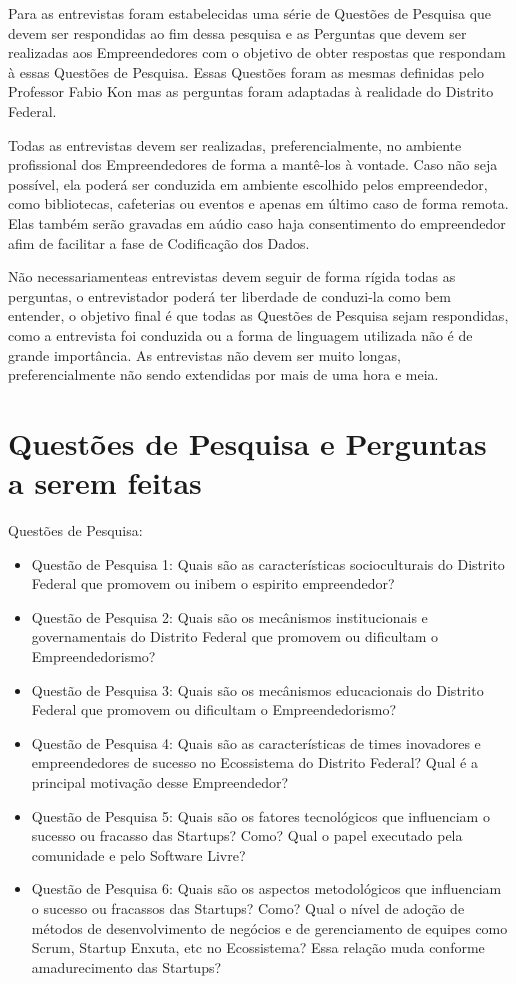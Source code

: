 Para as entrevistas foram estabelecidas uma série de Questões de Pesquisa que devem ser respondidas ao fim dessa pesquisa e as Perguntas que devem ser realizadas aos Empreendedores com o objetivo de
obter respostas que respondam à essas Questões de Pesquisa. Essas Questões foram as mesmas definidas pelo Professor Fabio Kon mas as perguntas foram adaptadas à realidade do Distrito Federal.

Todas as entrevistas devem ser realizadas, preferencialmente, no ambiente profissional dos Empreendedores de forma a mantê-los à vontade. Caso não seja possível, ela poderá ser conduzida em ambiente
escolhido pelos empreendedor, como bibliotecas, cafeterias ou eventos e apenas em último caso de forma remota. Elas também serão gravadas em aúdio caso haja consentimento do empreendedor afim de
facilitar a fase de Codificação dos Dados.

Não necessariamenteas entrevistas devem seguir de forma rígida todas as perguntas, o entrevistador poderá ter liberdade de conduzi-la como bem entender, o objetivo final é que todas as Questões de Pesquisa
sejam respondidas, como a entrevista foi conduzida ou a forma de linguagem utilizada não é de grande importância. As entrevistas não devem ser muito longas, preferencialmente não sendo extendidas por mais
de uma hora e meia.

\section{Questões de Pesquisa e Perguntas a serem feitas}
\label{section:questoes_de_pesquisa_e_perguntas}

Questões de Pesquisa:
\begin{itemize}
  \item Questão de Pesquisa 1: Quais são as características socioculturais do Distrito Federal que promovem ou inibem o espirito empreendedor?
  \item Questão de Pesquisa 2: Quais são os mecânismos institucionais e governamentais do Distrito Federal que promovem ou dificultam o Empreendedorismo?
  \item Questão de Pesquisa 3: Quais são os mecânismos educacionais do Distrito Federal que promovem ou dificultam o Empreendedorismo?
  \item Questão de Pesquisa 4: Quais são as características de times inovadores e empreendedores de sucesso no Ecossistema do Distrito Federal? Qual é a principal motivação desse Empreendedor?
  \item Questão de Pesquisa 5: Quais são os fatores tecnológicos que influenciam o sucesso ou fracasso das Startups? Como? Qual o papel executado pela comunidade e pelo Software Livre?
  \item Questão de Pesquisa 6: Quais são os aspectos metodológicos que influenciam o sucesso ou fracassos das Startups? Como? Qual o nível de adoção de métodos de desenvolvimento de negócios
  e de gerenciamento de equipes como Scrum, Startup Enxuta, etc no Ecossistema? Essa relação muda conforme amadurecimento das Startups?
\end{itemize}


